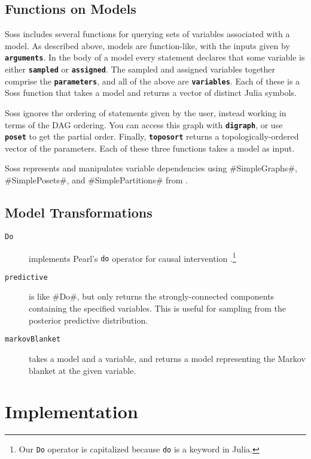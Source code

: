\documentclass[anonymous=false, %
               format=acmsmall, %
               review=true, %
               screen=true, %
               nonacm=true]{acmart}
\begin{document}
\subsection{Functions on Models}

Soss includes several functions for querying sets of variables associated with a model. As described above, models are function-like, with the inputs given by {\bf \texttt{arguments}}. In the body of a model every statement declares that some variable is either {\bf \texttt{sampled}} or {\bf \texttt{assigned}}. The sampled and assigned variables together comprise the {\bf \texttt{parameters}}, and all of the above are {\bf \texttt{variables}}. Each of these is a Soss function that takes a model and returns a vector of distinct Julia symbols.

Soss ignores the ordering of statements given by the user, instead working in terms of the DAG ordering. You can access this graph with {\bf \texttt{digraph}}, or use {\bf \texttt{poset}} to get the partial order. Finally, {\bf \texttt{toposort}} returns a topologically-ordered vector of the parameters. Each of these three functions takes a model as input.

Soss represents and manipulates variable dependencies using \jl#SimpleGraphs#, \jl#SimplePosets#, and \jl#SimplePartitions# from \cite{SimpleWorld}.


\subsection{Model Transformations}

\begin{description}
    \item[\texttt{Do}] implements Pearl's {\footnotesize\texttt{do}} operator for causal intervention \cite{Pearl1995}.\footnote{Our {\footnotesize\texttt{Do}} operator is capitalized because {\footnotesize\texttt{do}} is a keyword in Julia.}
    \item[\texttt{predictive}] is like \jl#Do#, but only returns the strongly-connected components containing the specified variables. This is useful for sampling from the posterior predictive distribution.
    \item[\texttt{markovBlanket}]  takes a model and a variable, and returns a model representing the Markov blanket at the given variable.
\end{description}

\section{Implementation}
\end{document}
